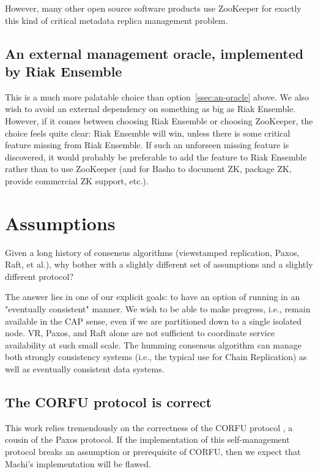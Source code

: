 \documentclass[preprint,10pt]{sigplanconf}
\begin{document}
However, many other open source software products use ZooKeeper for
exactly this kind of critical metadata replica management problem.

\subsection{An external management oracle, implemented by Riak Ensemble}

This is a much more palatable choice than option~\ref{ssec:an-oracle}
above.  We also
wish to avoid an external dependency on something as big as Riak
Ensemble.  However, if it comes between choosing Riak Ensemble or
choosing ZooKeeper, the choice feels quite clear: Riak Ensemble will
win, unless there is some critical feature missing from Riak
Ensemble.  If such an unforseen missing feature is discovered, it
would probably be preferable to add the feature to Riak Ensemble
rather than to use ZooKeeper (and for Basho to document ZK, package
ZK, provide commercial ZK support, etc.).

\section{Assumptions}
\label{sec:assumptions}

Given a long history of consensus algorithms (viewstamped replication,
Paxos, Raft, et al.), why bother with a slightly different set of
assumptions and a slightly different protocol?

The answer lies in one of our explicit goals: to have an option of
running in an "eventually consistent" manner.  We wish to be able to
make progress, i.e., remain available in the CAP sense, even if we are
partitioned down to a single isolated node.  VR, Paxos, and Raft
alone are not sufficient to coordinate service availability at such
small scale.  The humming consensus algorithm can manage
both strongly consistency systems (i.e., the typical use for Chain
Replication) as well as eventually consistent data systems.

\subsection{The CORFU protocol is correct}

This work relies tremendously on the correctness of the CORFU
protocol \cite{corfu1}, a cousin of the Paxos protocol.
If the implementation of
this self-management protocol breaks an assumption or prerequisite of
CORFU, then we expect that Machi's implementation will be flawed.
\end{document}
